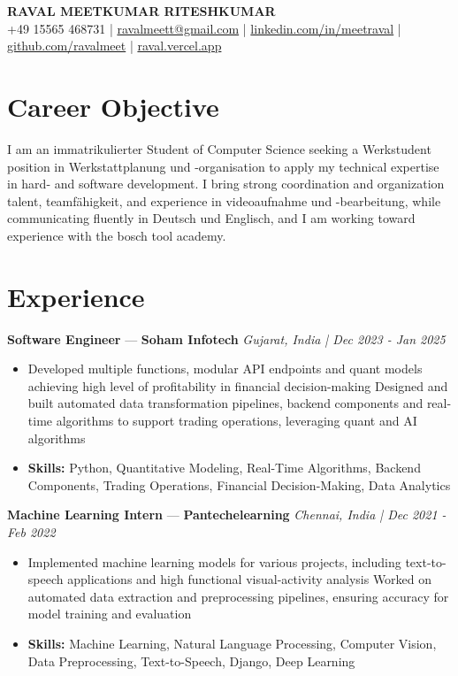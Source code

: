 \documentclass[a4paper,10pt]{article}
\begin{document}
\begin{center}
  {\Large\bfseries RAVAL MEETKUMAR RITESHKUMAR}\\[2pt]
  {\small +49 15565 468731 \;|\; \href{mailto:ravalmeett@gmail.com}{ravalmeett@gmail.com} \;|\; \href{https://www.linkedin.com/in/meetraval/}{linkedin.com/in/meetraval} \;|\; \href{https://github.com/ravalmeet}{github.com/ravalmeet} \;|\; \href{https://raval.vercel.app/}{raval.vercel.app}}
\end{center}
\vspace{-3pt}

\section*{Career Objective}
I am an immatrikulierter Student of Computer Science seeking a Werkstudent position in Werkstattplanung und -organisation to apply my technical expertise in hard- and software development. I bring strong coordination and organization talent, teamfähigkeit, and experience in videoaufnahme und -bearbeitung, while communicating fluently in Deutsch und Englisch, and I am working toward experience with the bosch tool academy.\par

\section*{Experience}
\textbf{Software Engineer} — \textbf{Soham Infotech} \hfill \textit{Gujarat, India \;|\; Dec 2023 - Jan 2025}\par
\vspace{1pt}
\begin{itemize}
  \item Developed multiple functions, modular API endpoints and quant models achieving high level of profitability in financial decision-making Designed and built automated data transformation pipelines, backend components and real-time algorithms to support trading operations, leveraging quant and AI algorithms
  \item \textbf{Skills:} Python, Quantitative Modeling, Real-Time Algorithms, Backend Components, Trading Operations, Financial Decision-Making, Data Analytics
\end{itemize}
\vspace{3pt}
\textbf{Machine Learning Intern} — \textbf{Pantechelearning} \hfill \textit{Chennai, India \;|\; Dec 2021 - Feb 2022}\par
\vspace{1pt}
\begin{itemize}
  \item Implemented machine learning models for various projects, including text-to-speech applications and high functional visual-activity analysis Worked on automated data extraction and preprocessing pipelines, ensuring accuracy for model training and evaluation
  \item \textbf{Skills:} Machine Learning, Natural Language Processing, Computer Vision, Data Preprocessing, Text-to-Speech, Django, Deep Learning
\end{itemize}
\end{document}
